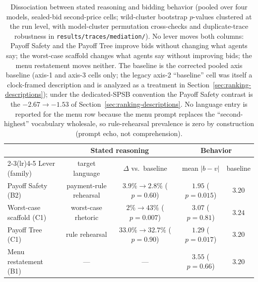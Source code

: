 \begin{table}[htbp]
\centering
\small
\begin{tabular}{lcccc}
\toprule
& \multicolumn{2}{c}{Stated reasoning} & \multicolumn{2}{c}{Behavior} \\
\cmidrule(lr){2-3}\cmidrule(lr){4-5}
Lever (family) & target language & $\Delta$ vs.\ baseline &
mean $|b-v|$ & baseline \\
\midrule
Payoff Safety (B2) & payment-rule rehearsal & $3.9\%\to 2.8\%$ ($p=0.60$) &
$1.95$ ($p=0.015$) & $3.20$ \\
Worst-case scaffold (C1) & worst-case rhetoric & $2\%\to 43\%$ ($p=0.007$) &
$3.07$ ($p=0.81$) & $3.24$ \\
Payoff Tree (C1) & rule rehearsal & $33.0\%\to 32.7\%$ ($p=0.90$) &
$1.29$ ($p=0.017$) & $3.20$ \\
Menu restatement (B1) & --- & --- &
$3.55$ ($p=0.66$) & $3.20$ \\
\bottomrule
\end{tabular}
\caption{Dissociation between stated reasoning and bidding behavior
(pooled over four models, sealed-bid second-price cells; wild-cluster
bootstrap $p$-values clustered at the run level, with model-cluster
permutation cross-checks and duplicate-trace robustness in
\texttt{results/traces/mediation/}). No lever moves both columns: Payoff
Safety and the Payoff Tree improve bids without changing what agents say;
the worst-case scaffold changes what agents say without improving bids; the
menu restatement moves neither. The baseline is the corrected pooled axis
baseline (axis-1 and axis-3 cells only; the legacy axis-2 ``baseline'' cell
was itself a clock-framed description and is analyzed as a treatment in
Section~\ref{sec:ranking-descriptions}); under the dedicated-SPSB convention
the Payoff Safety contrast is the $-2.67 \to -1.53$ of
Section~\ref{sec:ranking-descriptions}. No language entry is reported for the
menu row because the menu prompt replaces the ``second-highest'' vocabulary
wholesale, so rule-rehearsal prevalence is zero by construction (prompt echo,
not comprehension).}
\label{tab:trace-dissociation}
\end{table}
